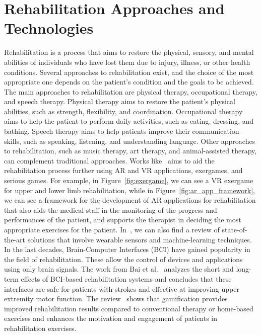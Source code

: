 \section{Rehabilitation Approaches and Technologies}
Rehabilitation is a process that aims to restore the physical, sensory, and mental abilities of individuals who have lost them due to injury, illness, or other health conditions.
Several approaches to rehabilitation exist, and the choice of the most appropriate one depends on the patient's condition and the goals to be achieved.
The main approaches to rehabilitation are physical therapy, occupational therapy, and speech therapy.
Physical therapy aims to restore the patient's physical abilities, such as strength, flexibility, and coordination.
Occupational therapy aims to help the patient to perform daily activities, such as eating, dressing, and bathing.
Speech therapy aims to help patients improve their communication skills, such as speaking, listening, and understanding language.
Other approaches to rehabilitation, such as music therapy, art therapy, and animal-assisted therapy, can complement traditional approaches.
Works like~\cite{202306.0333, 5567156, 10.4108/icst.pervasivehealth.2014.255277, trombetta} aims to aid the rehabilitation process further using AR and VR applications, exergames, and serious games.
For example, in Figure~\ref{fig:exergame}, we can see a VR exergame for upper and lower limb rehabilitation, while in Figure~\ref{fig:ar_app_framework}, we can see a framework for the development of AR applications for rehabilitation that also aids the medical staff in the monitoring of the progress and performances of the patient, and supports the therapist in deciding the most appropriate exercises for the patient.
In~\cite{BOUKHENNOUFA2022103197}, we can also find a review of state-of-the-art solutions that involve wearable sensors and machine-learning techniques.
In the last decades, Brain-Computer Interfaces (BCI) have gained popularity in the field of rehabilitation. These allow the control of devices and applications using only brain signals.
The work from Bai et al.~\cite{bai_immediate_2020} analyzes the short and long-term effects of BCI-based rehabilitation systems and concludes that these interfaces are safe for patients with strokes and effective at improving upper extremity motor function.
The review~\cite{alfieri_gamification_2022} shows that gamification provides improved rehabilitation results compared to conventional therapy or home-based exercises and enhances the motivation and engagement of patients in rehabilitation exercises.

